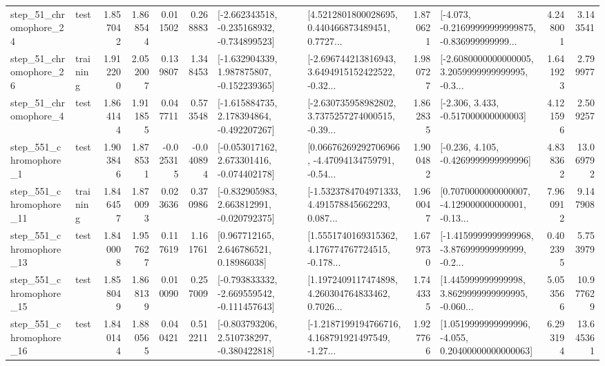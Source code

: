 \begin{tabular}{llrrrrllrlrr}
   step\_51\_chromophore\_24 &      test &      1.857042 &    1.868544 &      0.011502 &  0.268883 &  [-2.662343518, -0.235168932, -0.734899523] &  [4.5212801800028695, 0.440466873489451, 0.7727... &       1.870621 &  [-4.073, -0.21699999999999875, -0.836999999999... &            4.248001 &          3.143541 \\
   step\_51\_chromophore\_26 &  training &      1.912200 &    2.052007 &      0.139807 &  1.348453 &   [-1.632904339, 1.987875807, -0.152239365] &  [-2.696744213816943, 3.6494915152422522, -0.32... &       1.980727 &  [-2.6080000000000005, 3.2059999999999995, -0.3... &            1.641923 &          2.799977 \\
    step\_51\_chromophore\_4 &      test &      1.864144 &    1.911855 &      0.047711 &  0.573548 &   [-1.615884735, 2.178394864, -0.492207267] &  [-2.630735958982802, 3.7375257274000515, -0.39... &       1.862835 &                [-2.306, 3.433, -0.517000000000003] &            4.121596 &          2.509257 \\
   step\_551\_chromophore\_1 &      test &      1.903846 &    1.878531 &     -0.025315 & -0.040894 &   [-0.053017162, 2.673301416, -0.074402178] &  [0.06676269292706966, -4.47094134759791, -0.54... &       1.900482 &               [-0.236, 4.105, -0.4269999999999996] &            4.838362 &         13.069792 \\
  step\_551\_chromophore\_11 &  training &      1.846457 &    1.870093 &      0.023636 &  0.370986 &   [-0.832905983, 2.663812991, -0.020792375] &  [-1.5323784704971333, 4.491578845662293, 0.087... &       1.960047 &  [0.7070000000000007, -4.129000000000001, -0.13... &            7.960912 &          9.147908 \\
  step\_551\_chromophore\_13 &      test &      1.840008 &    1.957627 &      0.117619 &  1.161761 &      [0.967712165, 2.646786521, 0.18986038] &  [1.5551740169315362, 4.176774767724515, -0.178... &       1.679730 &  [-1.4159999999999968, -3.876999999999999, -0.2... &            0.402395 &          5.753979 \\
  step\_551\_chromophore\_15 &      test &      1.858049 &    1.868139 &      0.010090 &  0.257009 &  [-0.793833332, -2.669559542, -0.111457643] &  [1.1972409117474898, 4.260304764833462, 0.7026... &       1.744335 &  [1.445999999999998, 3.8629999999999995, -0.060... &            5.053566 &         10.977629 \\
  step\_551\_chromophore\_16 &      test &      1.840144 &    1.880565 &      0.040421 &  0.512211 &   [-0.803793206, 2.510738297, -0.380422818] &  [-1.2187199194766716, 4.168791921497549, -1.27... &       1.927766 &  [1.0519999999999996, -4.055, 0.20400000000000063] &            6.293194 &         13.645361 \\

\end{tabular}

